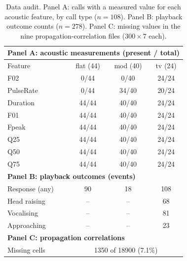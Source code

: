 \begin{table}[!ht]
\centering
\caption{Data audit. Panel A: calls with a measured value for each acoustic
feature, by call type ($n=108$). Panel B: playback outcome counts ($n=278$).
Panel C: missing values in the nine propagation-correlation files
($300\times7$ each).}
\label{tab:audit}
\footnotesize
\begin{tabular}{lccc}
\toprule
\multicolumn{4}{l}{\textbf{Panel A: acoustic measurements (present / total)}}\\
\midrule
Feature & flat (44) & mod (40) & tv (24)\\
\midrule
F02 & 0/44 & 0/40 & 24/24 \\
PulseRate & 0/44 & 34/40 & 20/24 \\
Duration & 44/44 & 40/40 & 24/24 \\
F01 & 44/44 & 40/40 & 24/24 \\
Fpeak & 44/44 & 40/40 & 24/24 \\
Q25 & 44/44 & 40/40 & 24/24 \\
Q50 & 44/44 & 40/40 & 24/24 \\
Q75 & 44/44 & 40/40 & 24/24 \\
\midrule
\multicolumn{4}{l}{\textbf{Panel B: playback outcomes (events)}}\\
\midrule
Response (any) & 90 & 18 & 108 \\
Head raising & -- & -- & 68 \\
Vocalising & -- & -- & 81 \\
Approaching & -- & -- & 23 \\
\midrule
\multicolumn{4}{l}{\textbf{Panel C: propagation correlations}}\\
\midrule
Missing cells & \multicolumn{3}{c}{1350 of 18900 (7.1\%)}\\
\bottomrule
\end{tabular}
\end{table}
